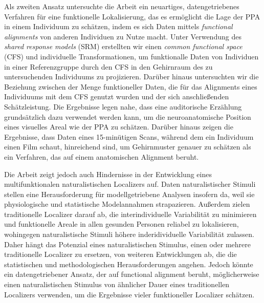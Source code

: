 Als zweiten Ansatz untersuchte die Arbeit ein neuartiges, datengetriebenes
Verfahren für eine funktionelle Lokalisierung, das es ermöglicht die Lage der
PPA in einem Individuum zu schätzen, indem es sich Daten mittels
\textit{functional alignments} von anderen Individuen zu Nutze macht.
%
Unter Verwendung des \textit{shared response models} (SRM) erstellten  wir
einen \textit{common functional space} (CFS) und individuelle Transformationen,
um funktionalle Daten von Individuen in einer Referenzgruppe durch den CFS in
den Gehirnraum des zu untersuchenden Individuums zu projizieren.
%
Darüber hinaus untersuchten wir die Beziehung zwischen der Menge funktioneller
Daten, die für das Alignments eines Individuums mit dem CFS genutzt wurden und
der sich anschließenden Schätzleistung.
Die Ergebnisse legen nahe, dass eine auditorische Erzählung grundsätzlich dazu
verwendet werden kann, um die neuroanatomische Position eines visuelles Areal
wie der PPA zu schätzen.
%
Darüber hinaus zeigen die Ergebnisse, dass Daten eines 15-minütigen Scans,
während dem ein Individuum einen Film schaut, hinreichend sind, um Gehirnmuster
genauer zu schätzen als ein Verfahren, das auf einem anatomischen Alignment beruht.

Die Arbeit zeigt jedoch auch Hindernisse in der Entwicklung eines
multifunktionalen naturalistischen Localizers auf.
%
Daten naturalistischer Stimuli stellen eine Herausforderung für
modellgetriebene Analysen insofern da, weil sie physiologische und statistische
Modelannahmen strapazieren.
%
Außerdem zielen traditionelle Localizer darauf ab, die interindividuelle
Variabilität zu minimieren und funktionelle Areale in allen gesunden Personen
reliabel zu lokalisieren, wohingegen naturalistische Stimuli höhere
inderidividuelle Variabilität zulassen.
Daher hängt das Potenzial eines naturalistischen Stimulus, einen oder mehrere
traditionelle Localizer zu ersetzen, von weiteren Entwicklungen ab, die die
statistischen und methodologischen Herausforderungen angehen.
%
Jedoch könnte ein datengetriebener Ansatz, der auf functional
alignment beruht, möglicherweise einen naturalistischen Stimulus von ähnlicher 
Dauer eines traditionellen Localizers verwenden, um die Ergebnisse vieler 
funktioneller Localizer schätzen.
